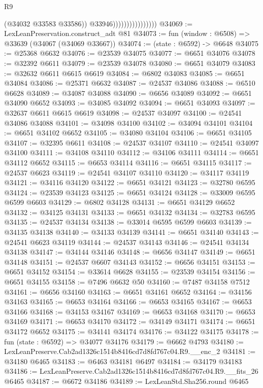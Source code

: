 \begin{lexlean}{R9}
\begin{coremodule}
                                      (@34032 @33583 @33586))
                                    @33946))))))))))))))))
@34069 := LexLeanPreservation.construct_adt @81
@34073 := fun (window : @6508) => @33639 (@34067 (@34069 @33667))
@34074 := (state : @6592) -> @6648
@34075 := @25368 @6632
@34076 := @23539 @34075
@34077 := @6651 @34076
@34078 := @32392 @6611
@34079 := @23539 @34078
@34080 := @6651 @34079
@34083 := @32632 @6611 @6615 @6619
@34084 := @6802 @34083
@34085 := @6651 @34084
@34086 := @25371 @6632
@34087 := @24537 @34086
@34088 := @6510 @6628
@34089 := @34087 @34088
@34090 := @6656 @34089
@34092 := @6651 @34090 @6652
@34093 := @34085 @34092
@34094 := @6651 @34093
@34097 := @32637 @6611 @6615 @6619
@34098 := @24537 @34097
@34100 := @24541 @34086 @34088
@34101 := @34098 @34100
@34102 := @34094 @34101
@34104 := @6651 @34102 @6652
@34105 := @34080 @34104
@34106 := @6651 @34105
@34107 := @32395 @6611
@34108 := @24537 @34107
@34110 := @24541 @34097 @34100
@34111 := @34108 @34110
@34112 := @34106 @34111
@34114 := @6651 @34112 @6652
@34115 := @6653 @34114
@34116 := @6651 @34115
@34117 := @24537 @6623
@34119 := @24541 @34107 @34110
@34120 := @34117 @34119
@34121 := @34116 @34120
@34122 := @6651 @34121
@34123 := @32780 @6595
@34124 := @23539 @34123
@34125 := @6651 @34124
@34128 := @33009 @6595 @6599 @6603
@34129 := @6802 @34128
@34131 := @6651 @34129 @6652
@34132 := @34125 @34131
@34133 := @6651 @34132
@34134 := @32783 @6595
@34135 := @24537 @34134
@34138 := @33014 @6595 @6599 @6603
@34139 := @34135 @34138
@34140 := @34133 @34139
@34141 := @6651 @34140
@34143 := @24541 @6623 @34119
@34144 := @24537 @34143
@34146 := @24541 @34134 @34138
@34147 := @34144 @34146
@34148 := @6656 @34147
@34149 := @6651 @34148
@34151 := @24537 @6607 @34143
@34152 := @6656 @34151
@34153 := @6651 @34152
@34154 := @33614 @6628
@34155 := @23539 @34154
@34156 := @6651 @34155
@34158 := @7496 @6632 @50
@34160 := @7487 @34158 @7512
@34161 := @6656 @34160
@34163 := @6651 @34161 @6652
@34164 := @34156 @34163
@34165 := @6653 @34164
@34166 := @6653 @34165
@34167 := @6653 @34166
@34168 := @34153 @34167
@34169 := @6653 @34168
@34170 := @6653 @34169
@34171 := @6653 @34170
@34172 := @34149 @34171
@34174 := @6651 @34172 @6652
@34175 := @34141 @34174
@34176 := @34122 @34175
@34178 := fun (state : @6592) => @34077 @34176
@34179 := @6662 @4793
@34180 := LexLeanPreserve.Cab2ad1326c1514b8416cd7d8fd767c04.R9.__enc_2
@34181 := @34180 @6465
@34183 := @6463 @34181 @6497
@34184 := @34179 @34183
@34186 := LexLeanPreserve.Cab2ad1326c1514b8416cd7d8fd767c04.R9.__fits_26 @6465
@34187 := @6672 @34186
@34189 := LexLeanStd.Sha256.round @6465

\end{coremodule}
\end{lexlean}
